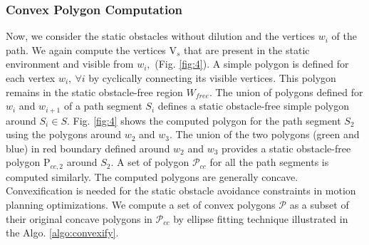 \subsubsection{Convex Polygon Computation}\label{sec:CPC}
Now, we consider the static obstacles without dilution and the vertices  $w_i$ of the path. We again compute the vertices $\mathrm{V}_s$ that are present in the static environment and visible from $w_i,$ (Fig. \ref{fig:4}). A simple polygon is defined for each vertex $w_i,\ \forall i$ by cyclically connecting its visible vertices. This polygon remains in the static obstacle-free region $W_{free}$. The union of polygons defined for $w_i$ and $w_{i+1}$ of a path segment $S_i$ defines a static obstacle-free simple polygon around $S_i\in S$. Fig. \ref{fig:4} shows the computed polygon for the path segment $S_2$ using the polygons around $w_2$ and $w_3$. The union of the two polygons (green and blue) in red boundary defined around $w_2$ and $w_3$ provides a static obstacle-free polygon $\mathrm{P}_{cc,2}$ around $S_2$. A set of polygon $\mathcal{P}_{cc}$ for all the path segments is computed similarly. The computed polygons are generally concave. Convexification is needed for the static obstacle avoidance constraints in motion planning optimizations. We compute a set of convex polygons $\mathcal{P}$ as a subset of their original concave polygons in $\mathcal{P}_{cc}$ by ellipse fitting technique illustrated in the Algo. \ref{algo:convexify}.
 
